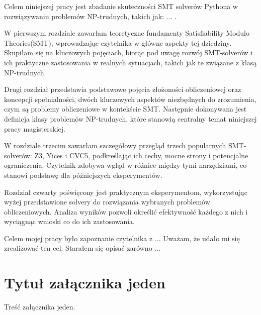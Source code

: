 \documentclass[xodstep]{wnspt}
\begin{document}
Celem niniejszej pracy jest zbadanie skuteczności SMT solverów Pythona w rozwiązywaniu problemów NP-trudnych, takich jak: ... .

W pierwszym rozdziale zawarłam teoretyczne fundamenty Satisfiability Modulo Theories(SMT), wprowadzając czytelnika w główne aspekty tej dziedziny. Skupiłam się na kluczowych pojęciach, biorąc pod uwagę rozwój SMT-solverów i ich praktyczne zastosowania w realnych sytuacjach, takich jak te związane z klasą NP-trudnych.

Drugi rozdział przedstawia podstawowe pojęcia złożoności obliczeniowej oraz koncepcji spełnialności, dwóch kluczowych aspektów niezbędnych do zrozumienia, czym są problemy obliczeniowe w kontekście SMT. Następnie dokonywana jest definicja klasy problemów NP-trudnych, które stanowią centralny temat niniejszej pracy magisterskiej.

W rozdziale trzecim zawarłam szczegółowy przegląd trzech popularnych SMT-solverów: Z3, Yices i CVC5, podkreślając ich cechy, mocne strony i potencjalne ograniczenia. Czytelnik zdobywa wgląd w różnice między tymi narzędziami, co stanowi podstawę dla późniejszych eksperymentów.

Rozdział czwarty poświęcony jest praktycznym eksperymentom, wykorzystując wyżej przedstawione solvery do rozwiązania wybranych problemów obliczeniowych. Analiza wyników pozwoli określić efektywność każdego z nich i wyciągnąc wnioski co do ich zastosowania.







\summary
Celem mojej pracy było zapoznanie czytelnika z ... 
Uważam, że udało mi się zrealizować ten cel. Starałem się opisać zarówno ...

\appendix
\chapter{Tytuł załącznika jeden}
Treść załącznika jeden.
\end{document}
